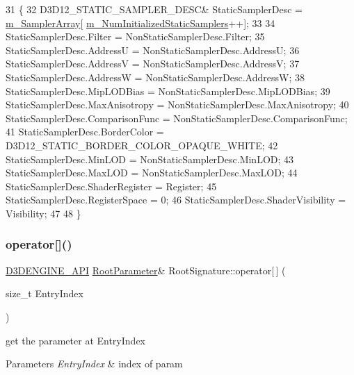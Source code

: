 \begin{DoxyCode}
31 \{
32     D3D12\_STATIC\_SAMPLER\_DESC& StaticSamplerDesc = \mbox{\hyperlink{class_root_signature_a7fea24906a1437ca55aaac9a8f6cc2f4}{m\_SamplerArray}}[
      \mbox{\hyperlink{class_root_signature_a4512fb5980e654113a04e4aff00e8bd7}{m\_NumInitializedStaticSamplers}}++];
33 
34     StaticSamplerDesc.Filter = NonStaticSamplerDesc.Filter;
35     StaticSamplerDesc.AddressU = NonStaticSamplerDesc.AddressU;
36     StaticSamplerDesc.AddressV = NonStaticSamplerDesc.AddressV;
37     StaticSamplerDesc.AddressW = NonStaticSamplerDesc.AddressW;
38     StaticSamplerDesc.MipLODBias = NonStaticSamplerDesc.MipLODBias;
39     StaticSamplerDesc.MaxAnisotropy = NonStaticSamplerDesc.MaxAnisotropy;
40     StaticSamplerDesc.ComparisonFunc = NonStaticSamplerDesc.ComparisonFunc;
41     StaticSamplerDesc.BorderColor = D3D12\_STATIC\_BORDER\_COLOR\_OPAQUE\_WHITE;
42     StaticSamplerDesc.MinLOD = NonStaticSamplerDesc.MinLOD;
43     StaticSamplerDesc.MaxLOD = NonStaticSamplerDesc.MaxLOD;
44     StaticSamplerDesc.ShaderRegister = Register;
45     StaticSamplerDesc.RegisterSpace = 0;
46     StaticSamplerDesc.ShaderVisibility = Visibility;
47 
48 \}
\end{DoxyCode}
\mbox{\label{class_root_signature_a95aadb8281dab5f2175605e72997377e}} 
\subsubsection{\texorpdfstring{operator[]()}{operator[]()}\hspace{0.1cm}{\footnotesize\ttfamily [1/2]}}
{\footnotesize\ttfamily \mbox{\hyperlink{stdafx_8h_a8ee2d990c5dfba7794dd2b60741d7722}{D3\+D\+E\+N\+G\+I\+N\+E\+\_\+\+A\+PI}} \mbox{\hyperlink{class_root_parameter}{Root\+Parameter}}\& Root\+Signature\+::operator\mbox{[}$\,$\mbox{]} (\begin{DoxyParamCaption}\item[{size\+\_\+t}]{Entry\+Index }\end{DoxyParamCaption})\hspace{0.3cm}{\ttfamily [inline]}}



get the parameter at Entry\+Index 


\begin{DoxyParams}{Parameters}
{\em Entry\+Index} & index of param \\
\hline
\end{DoxyParams}


